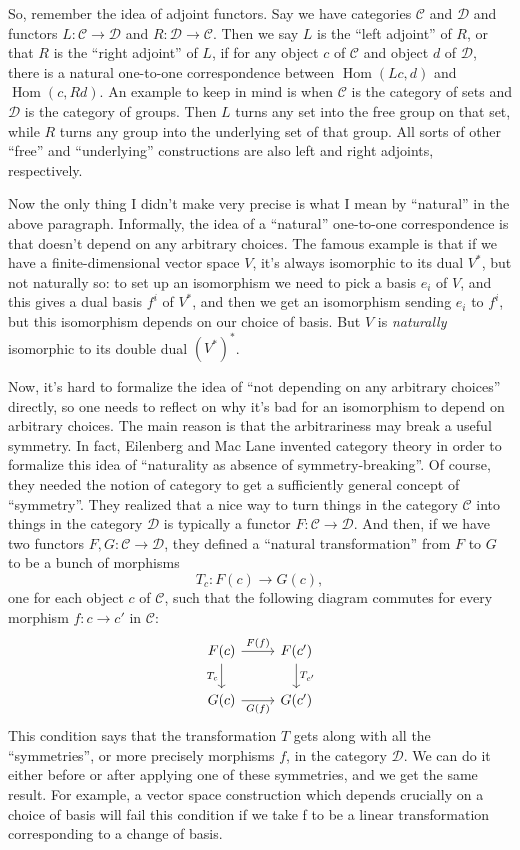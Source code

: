 \documentclass{article}
\begin{document}
So, remember the idea of adjoint functors. Say we have categories
\(\mathcal{C}\) and \(\mathcal{D}\) and functors
\(L\colon\mathcal{C}\to\mathcal{D}\) and
\(R\colon\mathcal{D}\to\mathcal{C}\). Then we say \(L\) is the ``left
adjoint'' of \(R\), or that \(R\) is the ``right adjoint'' of \(L\), if
for any object \(c\) of \(\mathcal{C}\) and object \(d\) of
\(\mathcal{D}\), there is a natural one-to-one correspondence between
\(\operatorname{Hom}(Lc,d)\) and \(\operatorname{Hom}(c,Rd)\). An
example to keep in mind is when \(\mathcal{C}\) is the category of sets
and \(\mathcal{D}\) is the category of groups. Then \(L\) turns any set
into the free group on that set, while \(R\) turns any group into the
underlying set of that group. All sorts of other ``free'' and
``underlying'' constructions are also left and right adjoints,
respectively.

Now the only thing I didn't make very precise is what I mean by
``natural'' in the above paragraph. Informally, the idea of a
``natural'' one-to-one correspondence is that doesn't depend on any
arbitrary choices. The famous example is that if we have a
finite-dimensional vector space \(V\), it's always isomorphic to its
dual \(V^*\), but not naturally so: to set up an isomorphism we need to
pick a basis \(e_i\) of \(V\), and this gives a dual basis \(f^i\) of
\(V^*\), and then we get an isomorphism sending \(e_i\) to \(f^i\), but
this isomorphism depends on our choice of basis. But \(V\) is
\emph{naturally} isomorphic to its double dual \((V^*)^*\).

Now, it's hard to formalize the idea of ``not depending on any arbitrary
choices'' directly, so one needs to reflect on why it's bad for an
isomorphism to depend on arbitrary choices. The main reason is that the
arbitrariness may break a useful symmetry. In fact, Eilenberg and Mac
Lane invented category theory in order to formalize this idea of
``naturality as absence of symmetry-breaking''. Of course, they needed
the notion of category to get a sufficiently general concept of
``symmetry''. They realized that a nice way to turn things in the
category \(\mathcal{C}\) into things in the category \(\mathcal{D}\) is
typically a functor \(F\colon\mathcal{C}\to\mathcal{D}\). And then, if
we have two functors \(F,G\colon\mathcal{C}\to\mathcal{D}\), they
defined a ``natural transformation'' from \(F\) to \(G\) to be a bunch
of morphisms \[T_c\colon F(c)\to G(c),\] one for each object \(c\) of
\(\mathcal{C}\), such that the following diagram commutes for every
morphism \(f\colon c\to c'\) in \(\mathcal{C}\): \[
  \begin{tikzcd}
    F(c) \rar["F(f)"] \dar[swap,"T_c"]
    & F(c') \dar["T_{c'}"]
  \\G(c) \rar[swap,"G(f)"]
    & G(c')
  \end{tikzcd}
\] This condition says that the transformation \(T\) gets along with all
the ``symmetries'', or more precisely morphisms \(f\), in the category
\(\mathcal{D}\). We can do it either before or after applying one of
these symmetries, and we get the same result. For example, a vector
space construction which depends crucially on a choice of basis will
fail this condition if we take f to be a linear transformation
corresponding to a change of basis.
\end{document}
